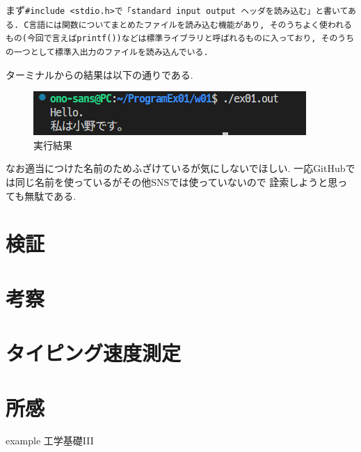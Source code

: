 \documentclass[a4paper, xelatex, ja=standard, 10.5pt]{bxjsarticle}
\begin{document}
まず\tt{\#include <stdio.h>}で「standard input output ヘッダを読み込む」と書いてある.
C言語には関数についてまとめたファイルを読み込む機能があり,
そのうちよく使われるもの(今回で言えば\tt{printf()})などは標準ライブラリと呼ばれるものに入っており,
そのうちの一つとして標準入出力のファイルを読み込んでいる.

ターミナルからの結果は以下の通りである.
\begin{figure}[H]
\centering
\includegraphics[scale=1.0]{img/wsl_result.png}
\caption{実行結果}
\label{}
\end{figure}
なお適当につけた名前のためふざけているが気にしないでほしい.
一応GitHubでは同じ名前を使っているがその他SNSでは使っていないので
詮索しようと思っても無駄である.

\section{検証}
\section{考察}
\section{タイピング速度測定}
\section{所感}

\begin{thebibliography}{9} %
  example 工学基礎I\hspace{-1.2pt}I\hspace{-1.2pt}I
\end{thebibliography}
\end{document}
